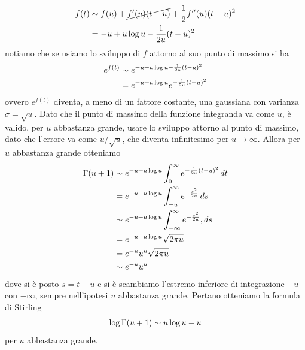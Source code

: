 \documentclass{article}
\begin{document}
\begin{align}
    f(t) &\sim f(u) + \cancel{f'(u)(t - u)} + \frac{1}{2}f''(u)(t - u)^2 \notag \\
    &= -u + u\log u - \frac{1}{2u}(t - u)^2 \notag
\end{align}
notiamo che se usiamo lo sviluppo di $f$ attorno al suo punto di massimo si ha
\begin{align}
    e^{f(t)} &\sim e^{-u + u\log u - \frac{1}{2u}(t - u)^2} \notag \\
    &= e^{-u + u\log u}e^{-\frac{1}{2u}(t - u)^2} \notag
\end{align}
ovvero $e^{f(t)}$ diventa, a meno di un fattore costante, una gaussiana con varianza $\sigma = \sqrt{u}$. Dato che il punto di massimo della funzione integranda va come $u$, è valido, per $u$ abbastanza grande, usare lo sviluppo attorno al punto di massimo, dato che l'errore va come $u/\sqrt{u}$, che diventa infinitesimo per $u \rightarrow \infty$. Allora per $u$ abbastanza grande otteniamo
\begin{align}
    \Gamma(u + 1) &\sim e^{-u + u\log u}\int_0^\infty e^{-\frac{1}{2u}(t - u)^2} \, dt \notag \\
    &= e^{-u + u\log u}\int_{-u}^\infty e^{-\frac{s^2}{2u}} \, ds \notag \\
    &\sim e^{-u + u\log u}\int_{-\infty}^\infty e^{-\frac{s^2}{2u}} , ds \notag \\
    &= e^{-u + u\log u}\sqrt{2\pi u} \notag \\
    &= e^{-u}u^u\sqrt{2\pi u} \notag \\
    &\sim e^{-u}u^u \notag
\end{align}
dove si è posto $s = t - u$ e si è scambiamo l'estremo inferiore di integrazione $-u$ con $-\infty$, sempre nell'ipotesi $u$ abbastanza grande. Pertano otteniamo la formula di Stirling
\begin{align}
    \log\Gamma(u + 1) \sim u\log u - u \notag
\end{align}
per $u$ abbastanza grande.
\end{document}
